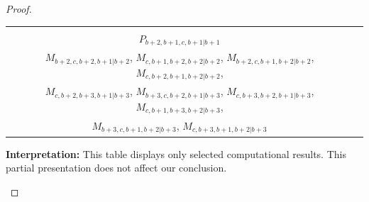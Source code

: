\begin{proof}
\begin{enumerate}
\begin{enumerate}
\begin{enumerate}
\begin{table}[htbp]
\begin{tabular}{cc}
 & \\
 $P_{b+2,b+1,c,b+1|b+1}$ & \makecell{
 $M_{b+2,b+2,c,b+1|b+2}$,
 $M_{b+2,b+1,c,b+2|b+2}$,
 $M_{b+3,b+2,c,b+1|b+3}$,
 $M_{b+3,b+1,c,b+2|b+3}$, \\
 $M_{b+2,c,b+2,b+1|b+2}$,
 $M_{c,b+1,b+2,b+2|b+2}$,
 $M_{b+2,c,b+1,b+2|b+2}$,
 $M_{c,b+2,b+1,b+2|b+2}$, \\
 $M_{c,b+2,b+3,b+1|b+3}$,
 $M_{b+3,c,b+2,b+1|b+3}$,
 $M_{c,b+3,b+2,b+1|b+3}$,
 $M_{c,b+1,b+3,b+2|b+3}$, \\
 $M_{b+3,c,b+1,b+2|b+3}$,
 $M_{c,b+3,b+1,b+2|b+3}$
}\\
\bottomrule
\end{tabular}
\vspace{0.5em}
\parbox{\linewidth}{\small
\textbf{Interpretation:}
This table displays only selected computational results. This partial presentation does not affect our conclusion.
}
\end{table}


\end{enumerate}
\end{enumerate}
\end{enumerate}
\end{proof}
